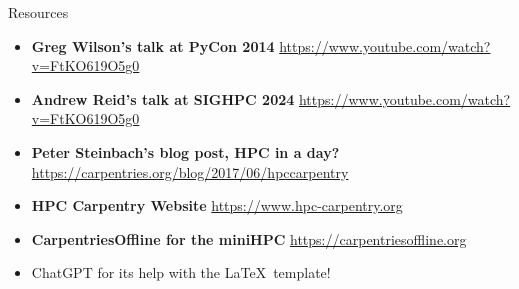 \begin{frame}{Resources}
	\begin{itemize}
		\item \textbf{Greg Wilson's talk at PyCon 2014} \url{https://www.youtube.com/watch?v=FtKO619O5g0}
		\item\textbf{ Andrew Reid's talk at SIGHPC 2024} \url{https://www.youtube.com/watch?v=FtKO619O5g0}
		\item\textbf{Peter Steinbach's blog post, HPC in a day?} \url{https://carpentries.org/blog/2017/06/hpccarpentry}
		\item\textbf{HPC Carpentry Website} 
		\url{https://www.hpc-carpentry.org}
		\item\textbf{CarpentriesOffline for the miniHPC}
		\url{https://carpentriesoffline.org}
		\item ChatGPT for its help with the \LaTeX \ template!
	\end{itemize}
\end{frame}